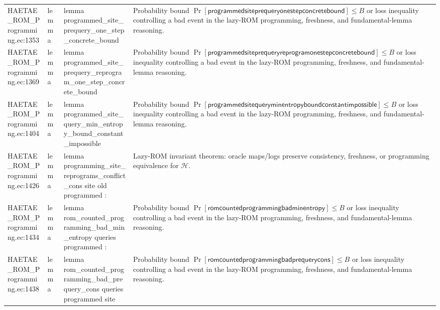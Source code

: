 \documentclass[10pt]{article}
\begin{document}
\begin{longtable}{L{0.11\textwidth}L{0.055\textwidth}L{0.385\textwidth}L{0.41\textwidth}}
HAETAE\_\allowbreak{}ROM\_\allowbreak{}Programming.\allowbreak{}ec:\allowbreak{}1353 & lemma & {\ttfamily\scriptsize lemma programmed\_\allowbreak{}site\_\allowbreak{}prequery\_\allowbreak{}one\_\allowbreak{}step\_\allowbreak{}concrete\_\allowbreak{}bound} & Probability bound $\Pr[\mathsf{programmedsiteprequeryonestepconcretebound}]\le B$ or loss inequality controlling a bad event in the lazy-ROM programming, freshness, and fundamental-lemma reasoning. \\
HAETAE\_\allowbreak{}ROM\_\allowbreak{}Programming.\allowbreak{}ec:\allowbreak{}1369 & lemma & {\ttfamily\scriptsize lemma programmed\_\allowbreak{}site\_\allowbreak{}prequery\_\allowbreak{}reprogram\_\allowbreak{}one\_\allowbreak{}step\_\allowbreak{}concrete\_\allowbreak{}bound} & Probability bound $\Pr[\mathsf{programmedsiteprequeryreprogramonestepconcretebound}]\le B$ or loss inequality controlling a bad event in the lazy-ROM programming, freshness, and fundamental-lemma reasoning. \\
HAETAE\_\allowbreak{}ROM\_\allowbreak{}Programming.\allowbreak{}ec:\allowbreak{}1404 & lemma & {\ttfamily\scriptsize lemma programmed\_\allowbreak{}site\_\allowbreak{}query\_\allowbreak{}min\_\allowbreak{}entropy\_\allowbreak{}bound\_\allowbreak{}constant\_\allowbreak{}impossible} & Probability bound $\Pr[\mathsf{programmedsitequeryminentropyboundconstantimpossible}]\le B$ or loss inequality controlling a bad event in the lazy-ROM programming, freshness, and fundamental-lemma reasoning. \\
HAETAE\_\allowbreak{}ROM\_\allowbreak{}Programming.\allowbreak{}ec:\allowbreak{}1426 & lemma & {\ttfamily\scriptsize lemma programming\_\allowbreak{}site\_\allowbreak{}reprograms\_\allowbreak{}conflict\_\allowbreak{}cons site old programmed :} & Lazy-ROM invariant theorem: oracle maps/logs preserve consistency, freshness, or programming equivalence for $\mathcal H$. \\
HAETAE\_\allowbreak{}ROM\_\allowbreak{}Programming.\allowbreak{}ec:\allowbreak{}1434 & lemma & {\ttfamily\scriptsize lemma rom\_\allowbreak{}counted\_\allowbreak{}programming\_\allowbreak{}bad\_\allowbreak{}min\_\allowbreak{}entropy queries programmed :} & Probability bound $\Pr[\mathsf{romcountedprogrammingbadminentropy}]\le B$ or loss inequality controlling a bad event in the lazy-ROM programming, freshness, and fundamental-lemma reasoning. \\
HAETAE\_\allowbreak{}ROM\_\allowbreak{}Programming.\allowbreak{}ec:\allowbreak{}1438 & lemma & {\ttfamily\scriptsize lemma rom\_\allowbreak{}counted\_\allowbreak{}programming\_\allowbreak{}bad\_\allowbreak{}prequery\_\allowbreak{}cons queries programmed site} & Probability bound $\Pr[\mathsf{romcountedprogrammingbadprequerycons}]\le B$ or loss inequality controlling a bad event in the lazy-ROM programming, freshness, and fundamental-lemma reasoning. \\

\end{longtable}
\end{document}
